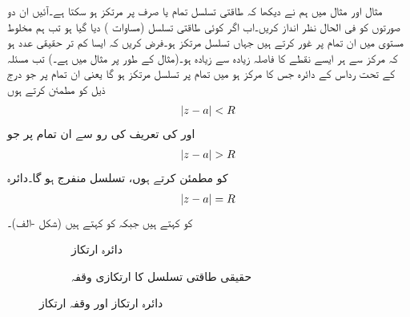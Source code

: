 مثال  اور مثال  میں ہم نے دیکھا کہ طاقتی تسلسل تمام  یا صرف  پر مرتکز ہو سکتا ہے۔آئیں ان دو صورتوں کو فی الحال نظر انداز کریں۔اب اگر کوئی  طاقتی تسلسل (مساوات ) دیا گیا ہو تب ہم مخلوط مستوی میں ان تمام  پر غور کرتے ہیں جہاں تسلسل مرتکز ہو۔فرض کریں کہ  ایسا کم تر حقیقی عدد ہو کہ مرکز  سے ہر ایسے نقطے کا فاصلہ زیادہ سے زیادہ  ہو۔(مثال کے طور پر مثال  میں  ہے۔)  تب مسئلہ  کے تحت رداس  کے دائرہ  جس کا مرکز  ہو میں تمام  پر تسلسل مرتکز ہو گا یعنی ان تمام  پر جو درج ذیل کو مطمئن کرتے ہوں
\begin{align}\label{مساوات_ٹیلر_رداس_مرکوزیت}
\abs{z-a}<R
\end{align}
اور  کی تعریف کی رو سے ان تمام  پر جو 
\begin{align*}
\abs{z-a}>R
\end{align*}
کو مطمئن کرتے ہوں، تسلسل منفرج ہو گا۔دائرہ
\begin{align*}
\abs{z-a}=R
\end{align*}
کو  کہتے ہیں جبکہ  کو  کہتے ہیں (شکل -الف)۔
\begin{figure}
\centering
\begin{subfigure}{0.45\textwidth}
\centering
{}
\caption{ دائرہ ارتکاز}
\end{subfigure} \hfill
\begin{subfigure}{0.45\textwidth}
\centering
{}
\caption{ حقیقی طاقتی تسلسل کا ارتکازی وقفہ}
\end{subfigure} \hfill
\caption{دائرہ ارتکاز اور وقفہ ارتکاز}
\label{شکل_ٹیلر_دائرہ_مرکوزیت_رداس_مرکوزیت}
\end{figure}

